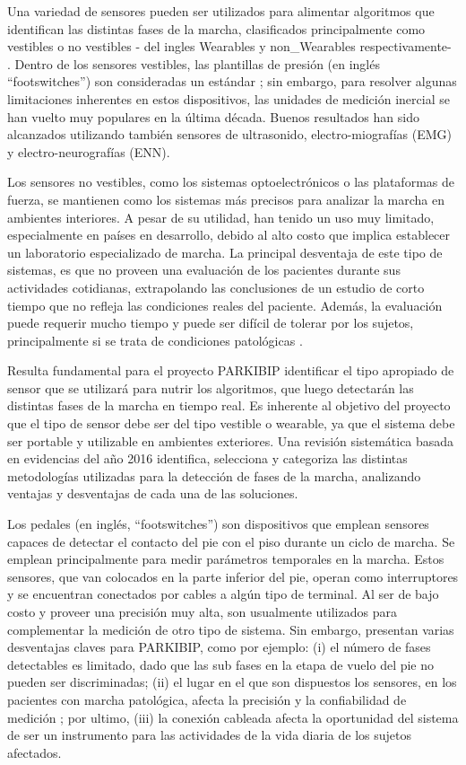 Una variedad de sensores pueden ser utilizados para alimentar algoritmos que identifican las distintas fases de la marcha, clasificados principalmente como vestibles o no vestibles - del ingles \gls{Wearables} y \gls{non_Wearables} respectivamente- . Dentro de los sensores vestibles, las plantillas de presión (en inglés ``footswitches'') son consideradas un estándar  \cite{Taborri2016}; sin embargo, para resolver algunas limitaciones inherentes en estos dispositivos, las unidades de medición inercial se han vuelto muy populares en la última década. Buenos resultados han sido alcanzados utilizando también sensores de ultrasonido, electro-miografías (EMG) y electro-neurografías (ENN). 

Los sensores no vestibles, como los sistemas optoelectrónicos o las plataformas de fuerza, se mantienen como los sistemas más precisos para analizar la marcha en ambientes interiores. A pesar de su utilidad, han tenido un uso muy limitado, especialmente en países en desarrollo, debido al alto costo que implica establecer un laboratorio especializado de marcha. La principal desventaja de este tipo de sistemas, es que no proveen una evaluación de los pacientes durante sus actividades cotidianas, extrapolando las conclusiones de un estudio de corto tiempo que no refleja las condiciones reales del paciente. Además, la evaluación puede requerir mucho tiempo y puede ser difícil de tolerar por los sujetos, principalmente si se trata de condiciones patológicas \cite{Kumar8372660}.

Resulta fundamental para el proyecto PARKIBIP identificar el tipo apropiado de sensor que se utilizará para nutrir los algoritmos, que luego detectarán las distintas fases de la marcha en tiempo real. Es inherente al objetivo del proyecto que el tipo de sensor debe ser del tipo vestible o wearable, ya que el sistema debe ser portable y utilizable en ambientes exteriores. Una revisión sistemática basada en evidencias del año 2016 \cite{Taborri2016} identifica, selecciona y categoriza las distintas metodologías utilizadas para la detección de fases de la marcha, analizando ventajas y desventajas de cada una de las soluciones. 

Los pedales (en inglés, ``footswitches'') son dispositivos que emplean sensores capaces de detectar el contacto del pie con el piso durante un ciclo de marcha. Se emplean principalmente para medir parámetros temporales en la marcha. Estos sensores, que van colocados en la parte inferior del pie, operan como interruptores y se encuentran conectados por cables a algún tipo de terminal. Al ser de bajo costo y proveer una precisión muy alta, son usualmente utilizados para complementar la medición de otro tipo de sistema. Sin embargo, presentan varias desventajas claves para PARKIBIP, como por ejemplo: (i) el número de fases detectables es limitado, dado que las sub fases en la etapa de vuelo del pie no pueden ser discriminadas; (ii) el lugar en el que son dispuestos los sensores, en los pacientes con marcha patológica, afecta la precisión y la confiabilidad de medición \cite{AMINIAN2002689}; por ultimo, (iii) la conexión cableada afecta la oportunidad del sistema de ser un instrumento para las actividades de la vida diaria de los sujetos afectados.

